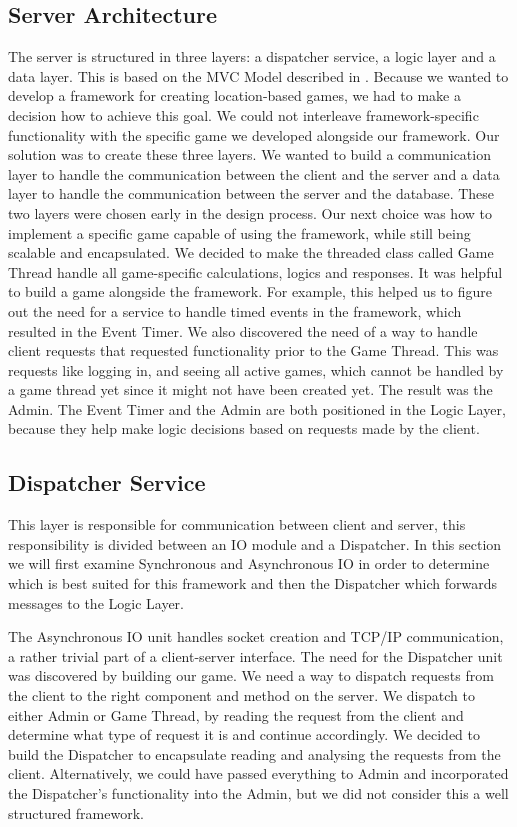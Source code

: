 \subsection{Server Architecture}
\label{sec:server}

The server is structured in three layers: a dispatcher service, a logic layer and a data layer. This is based on the MVC Model described in . Because we wanted to develop a framework for creating location-based games, we had to make a decision how to achieve this goal. We could not interleave framework-specific functionality with the specific game we developed alongside our framework. Our solution was to create these three layers. We wanted to build a communication layer to handle the communication between the client and the server and a data layer to handle the communication between the server and the database. These two layers were chosen early in the design process. Our next choice was how to implement a specific game capable of using the framework, while still being scalable and encapsulated. We decided to make the threaded class called Game Thread handle all game-specific calculations, logics and responses. 
It was helpful to build a game alongside the framework. For example, this helped us to figure out the need for a service to handle timed events in the framework, which resulted in the Event Timer. We also discovered the need of a way to handle client requests that requested functionality prior to the Game Thread. This was requests like logging in, and seeing all active games, which cannot be handled by a game thread yet since it might not have been created yet. The result was the Admin. The Event Timer and the Admin are both positioned in the Logic Layer, because they help make logic decisions based on requests made by the client. 



\subsection{Dispatcher Service}
This layer is responsible for communication between client and server, this responsibility is divided between an IO module and a Dispatcher. In this section we will first examine Synchronous and Asynchronous IO in order to determine which is best suited for this framework and then the Dispatcher which forwards messages to the Logic Layer. 

The Asynchronous IO unit handles socket creation and TCP/IP communication, a rather trivial part of a client-server interface. The need for the Dispatcher unit was discovered by building our game. We need a way to dispatch requests from the client to the right component and method on the server. We dispatch to either Admin or Game Thread, by reading the request from the client and determine what type of request it is and continue accordingly. We decided to build the Dispatcher to encapsulate reading and analysing the requests from the client. Alternatively, we could have passed everything to Admin and incorporated the Dispatcher's functionality into the Admin, but we did not consider this a well structured framework.

